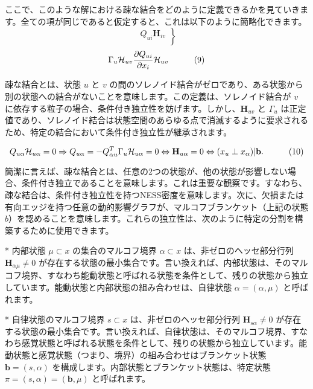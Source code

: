 \documentclass[a4paper, titlepage]{jsarticle}
\begin{document}
ここで、このような解における疎な結合をどのように定義できるかを見ていきます。全ての項が同じであると仮定すると、これは以下のように簡略化できます。
\begin{equation}\label{sparse_coupling}
    \left.
    \begin{array}{l}
        Q_{ui}\mathbf{H}_{iv} \\
        
    \end{array}
    \right\}
\end{equation}
$$
 \\
\Gamma_{u}\mathcal{H}_{uv} \\
\frac{\partial Q_{u i}}{\partial x_{i}} \mathcal{H}_{uv} \\
\quad \quad \quad (9)
$$

疎な結合とは、状態 $u$ と $v$ の間のソレノイド結合がゼロであり、ある状態から別の状態への結合がないことを意味します。この定義は、ソレノイド結合が $v$ に依存する粒子の場合、条件付き独立性を妨げます。しかし、$\mathbf{H}_{uv}$ と $\Gamma_{u}$ は正定値であり、ソレノイド結合は状態空間のあらゆる点で消滅するように要求されるため、特定の結合において条件付き独立性が継承されます。

$$
Q_{u\alpha}\mathcal{H}_{u\alpha} = 0 \Rightarrow Q_{u\alpha} = -Q_{\alpha u}^T \\
\Gamma_{u}\mathcal{H}_{u\alpha} = 0 \Leftrightarrow \mathbf{H}_{u\alpha} = 0 \Leftrightarrow (x_u \perp x_\alpha) | \mathbf{b}. \quad \quad \quad (10)
$$

簡潔に言えば、疎な結合とは、任意の2つの状態が、他の状態が影響しない場合、条件付き独立であることを意味します。これは重要な観察です。すなわち、疎な結合は、条件付き独立性を持つNESS密度を意味します。次に、欠損または有向エッジを持つ任意の動的影響グラフが、マルコフブランケット（上記の状態 $b$）を認めることを意味します。これらの独立性は、次のように特定の分割を構築するために使用できます。

*   内部状態 $\mu \subset x$ の集合のマルコフ境界 $\alpha \subset x$ は、非ゼロのヘッセ部分行列 $\mathbf{H}_{\alpha\mu} \neq 0$ が存在する状態の最小集合です。言い換えれば、内部状態は、そのマルコフ境界、すなわち能動状態と呼ばれる状態を条件として、残りの状態から独立しています。能動状態と内部状態の組み合わせは、自律状態 $\alpha = (\alpha, \mu)$ と呼ばれます。

*   自律状態のマルコフ境界 $s \subset x$ は、非ゼロのヘッセ部分行列 $\mathbf{H}_{s\alpha} \neq 0$ が存在する状態の最小集合です。言い換えれば、自律状態は、そのマルコフ境界、すなわち感覚状態と呼ばれる状態を条件として、残りの状態から独立しています。能動状態と感覚状態（つまり、境界）の組み合わせはブランケット状態 $\mathbf{b} = (s, \alpha)$ を構成します。内部状態とブランケット状態は、特定状態 $\pi = (s, \alpha) = (\mathbf{b}, \mu)$ と呼ばれます。
\end{document}

